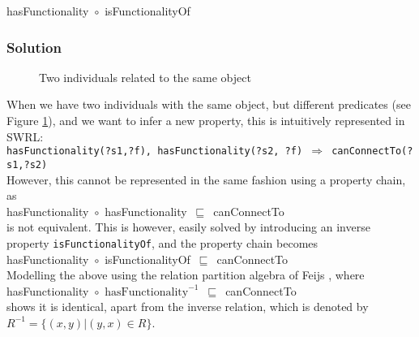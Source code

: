 \noindent
hasFunctionality~\ensuremath{\circ}~isFunctionalityOf

\subsubsection{Solution}

\begin{figure}[bth]
	\caption{Two individuals related to the same object}
	\label{canConnectTo2}        
\end{figure}

When we have two individuals with the same object, but different predicates (see Figure \ref{canConnectTo2}), and we want to infer a new property, this is intuitively represented in \ac{SWRL}: \\

\noindent
\texttt{hasFunctionality(?s1,?f), hasFunctionality(?s2, ?f) $\Rightarrow$ canConnectTo(?s1,?s2)}\\

However, this cannot be represented in the same fashion using a property chain, as\\ 

\noindent
hasFunctionality~\ensuremath{\circ}~hasFunctionality~\ensuremath{\sqsubseteq}~canConnectTo\\

is not equivalent. This is however, easily solved by introducing an inverse property \texttt{isFunctionalityOf}, and the property chain becomes\\

\noindent
hasFunctionality~\ensuremath{\circ}~isFunctionalityOf~\ensuremath{\sqsubseteq}~canConnectTo\\

Modelling the above using the relation partition algebra of Feijs \cite{Feijs1999}, where\\

\noindent
hasFunctionality~\ensuremath{\circ}~$\text{hasFunctionality}^{-1}$~\ensuremath{\sqsubseteq}~canConnectTo\\

shows it is identical, apart from the inverse relation, which is denoted by  $R^{-1} = \{ (x,y) | (y,x) \in R \}$.

